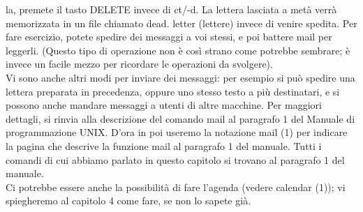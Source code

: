 la, premete il tasto DELETE invece di ct/-d. La lettera lasciata a metà verrà memorizzata
in un file chiamato dead. letter (lettere) invece di venire spedita.
Per fare esercizio, potete spedire dei messaggi a voi stessi, e poi battere mail per leggerli.
(Questo tipo di operazione non è così strano come potrebbe sembrare; è invece
un facile mezzo per ricordare le operazioni da svolgere).\\
Vi sono anche altri modi per inviare dei messaggi: per esempio si può spedire una
lettera preparata in precedenza, oppure uno stesso testo a più destinatari, e si possono 
anche mandare messaggi a utenti di altre macchine. Per maggiori dettagli, si rinvia
alla descrizione del comando mail al paragrafo 1 del Manuale di programmazione
UNIX. D'ora in poi useremo la notazione mail (1) per indicare la pagina che descrive 
la funzione mail al paragrafo 1 del manuale. Tutti i comandi di cui abbiamo parlato in
questo capitolo si trovano al paragrafo 1 del manuale.\\
Ci potrebbe essere anche la possibilità di fare l'agenda (vedere calendar (1)); vi spiegheremo
al capitolo 4 come fare, se non lo sapete già.
